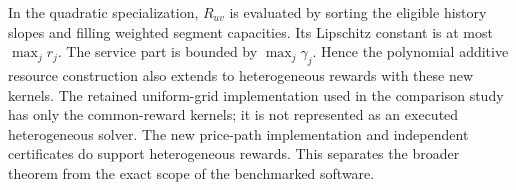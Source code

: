 In the quadratic specialization, $R_{uv}$ is evaluated by sorting the eligible history slopes and filling weighted segment capacities. Its Lipschitz constant is at most $\max_j r_j$. The service part is bounded by $\max_j\gamma_j$. Hence the polynomial additive resource construction also extends to heterogeneous rewards with these new kernels. The retained uniform-grid implementation used in the comparison study has only the common-reward kernels; it is not represented as an executed heterogeneous solver. The new price-path implementation and independent certificates do support heterogeneous rewards. This separates the broader theorem from the exact scope of the benchmarked software.
